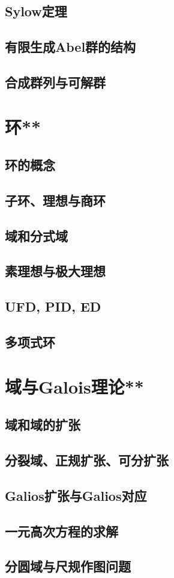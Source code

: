 \subsection{Sylow定理}
\clearpage
\subsection{有限生成Abel群的结构}
\clearpage
\subsection{合成群列与可解群}
\clearpage

\section{环**}
\subsection{环的概念}
\clearpage
\subsection{子环、理想与商环}
\clearpage
\subsection{域和分式域}
\clearpage
\subsection{素理想与极大理想}
\clearpage
\subsection{UFD, PID, ED}
\clearpage
\subsection{多项式环}

\section{域与Galois理论**}
\clearpage
\subsection{域和域的扩张}
\clearpage
\subsection{分裂域、正规扩张、可分扩张}
\clearpage
\subsection{Galios扩张与Galios对应}
\clearpage
\subsection{一元高次方程的求解}
\clearpage
\subsection{分圆域与尺规作图问题}